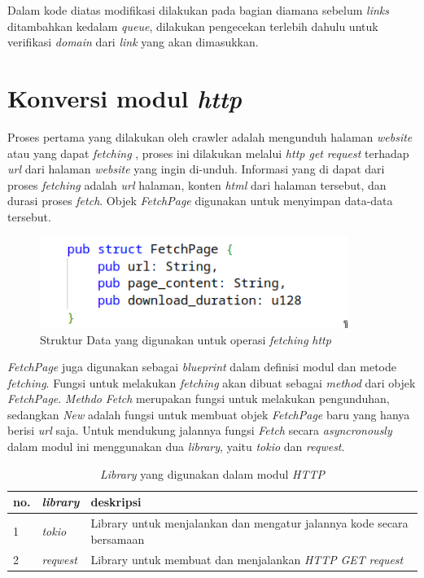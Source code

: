 Dalam kode diatas modifikasi dilakukan pada bagian diamana sebelum \emph{links} ditambahkan kedalam \emph{queue}, dilakukan pengecekan terlebih dahulu untuk verifikasi \emph{domain} dari \emph{link} yang akan dimasukkan.

\section{Konversi modul \emph{http}}

Proses pertama yang dilakukan oleh crawler adalah mengunduh halaman \emph{website} atau yang dapat \emph{fetching} , proses ini dilakukan melalui \emph{http get} \emph{request} terhadap \emph{url} dari halaman \emph{website} yang ingin di-unduh. Informasi yang di dapat dari proses \emph{fetching} adalah \emph{url} halaman, konten \emph{html} dari halaman tersebut, dan durasi proses \emph{fetch}. Objek \emph{FetchPage} digunakan untuk menyimpan data-data tersebut.

\begin{figure}[H]
	\centering
	\includegraphics[keepaspectratio, width=10cm]{gambar/http-request-rust-struct.png}
  \caption{Struktur Data yang digunakan untuk operasi \emph{fetching} \emph{http}}
	\label{gambar:http_struct_rust}
\end{figure}

\emph{FetchPage} juga digunakan sebagai \emph{blueprint} dalam definisi modul dan metode \emph{fetching}. Fungsi untuk melakukan \emph{fetching} akan dibuat sebagai \emph{method} dari objek \emph{FetchPage}. \emph{Methdo} \emph{Fetch} merupakan fungsi untuk melakukan pengunduhan, sedangkan \emph{New} adalah fungsi untuk membuat objek \emph{FetchPage} baru yang hanya berisi \emph{url} saja. Untuk mendukung jalannya fungsi \emph{Fetch} secara \emph{asyncronously} dalam modul ini menggunakan dua \emph{library}, yaitu \emph{tokio} dan \emph{reqwest}.

\begin{table}[H]
  \caption{\emph{Library} yang digunakan dalam modul \emph{HTTP}}
  \begin{center}
    \begin{tabular}{ |p{1cm}|p{3cm}|p{7cm}| } \hline
      \textbf{no}.& \textbf{\emph{library}}& \textbf{deskripsi} \\ \hline
      1& \emph{tokio}& Library untuk menjalankan dan mengatur jalannya kode secara bersamaan \\ \hline
      2& \emph{reqwest}& Library untuk membuat dan menjalankan \emph{HTTP} \emph{GET} \emph{request} \\ \hline
    \end{tabular}
  \end{center}
\end{table}


